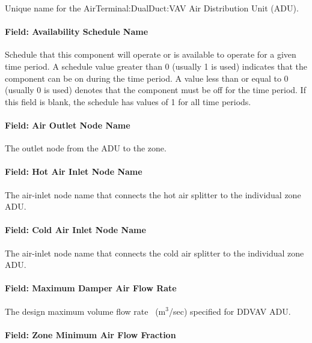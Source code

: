 Unique name for the AirTerminal:DualDuct:VAV Air Distribution Unit (ADU).

\paragraph{Field: Availability Schedule Name}\label{field-availability-schedule-name-12}

Schedule that this component will operate or is available to operate for a given time period. A schedule value greater than 0 (usually 1 is used) indicates that the component can be on during the time period. A value less than or equal to 0 (usually 0 is used) denotes that the component must be off for the time period. If this field is blank, the schedule has values of 1 for all time periods.

\paragraph{Field: Air Outlet Node Name}\label{field-air-outlet-node-name-8}

The outlet node from the ADU to the zone.

\paragraph{Field: Hot Air Inlet Node Name}\label{field-hot-air-inlet-node-name-1}

The air-inlet node name that connects the hot air splitter to the individual zone ADU.

\paragraph{Field: Cold Air Inlet Node Name}\label{field-cold-air-inlet-node-name-1}

The air-inlet node name that connects the cold air splitter to the individual zone ADU.

\paragraph{Field: Maximum Damper Air Flow Rate}\label{field-maximum-damper-air-flow-rate}

The design maximum volume flow rate~ (m\(^{3}\)/sec) specified for DDVAV ADU.

\paragraph{Field: Zone Minimum Air Flow Fraction}\label{field-zone-minimum-air-flow-fraction-3}

